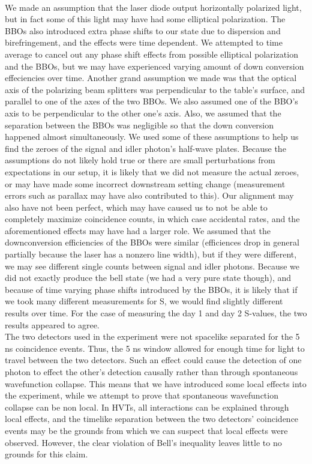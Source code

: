 \documentclass{article}
\begin{document}
    \\\indent We made an assumption that the laser diode output horizontally polarized light, but in fact some of this light may have had some elliptical polarization. The BBOs also introduced extra phase shifts to our state due to dispersion and birefringement, and the effects were time dependent. We attempted to time average to cancel out any phase shift effects from possible elliptical polarization and the BBOs, but we may have experienced varying amount of down conversion effeciencies over time. Another grand assumption we made was that the optical axis of the polarizing beam splitters was perpendicular to the table's surface, and parallel to one of the axes of the two BBOs. We also assumed one of the BBO's axis to be perpendicular to the other one's axis. Also, we assumed that the separation between the BBOs was negligible so that the down conversion happened almost simultaneously. We used some of these assumptions to help us find the zeroes of the signal and idler photon's half-wave plates. Because the assumptions do not likely hold true or there are small perturbations from expectations in our setup, it is likely that we did not measure the actual zeroes, or may have made some incorrect downstream setting change (measurement errors such as parallax may have also contributed to this). Our alignment may also have not been perfect, which may have caused us to not be able to completely maximize coincidence counts, in which case accidental rates, and the aforementioned effects may have had a larger role. We assumed that the downconversion efficiencies of the BBOs were similar (efficiences drop in general partially because the laser has a nonzero line width), but if they were different, we may see different single counts between signal and idler photons. Because we did not exactly produce the bell state (we had a very pure state though), and because of time varying phase shifts introduced by the BBOs, it is likely that if we took many different measurements for S, we would find slightly different results over time. For the case of measuring the day 1 and day 2 S-values, the two results appeared to agree.
    \\\indent The two detectors used in the experiment were not spacelike separated for the 5 ns coincidence events. Thus, the 5 ns window allowed for enough time for light to travel between the two detectors. Such an effect could cause the detection of one photon to effect the other's detection causally rather than through spontaneous wavefunction collapse. This means that we have introduced some local effects into the experiment, while we attempt to prove that spontaneous wavefunction collapse can be non local. In HVTs, all interactions can be explained through local effects, and the timelike separation between the two detectors' coincidence events may be the grounds from which we can suspect that local effects were observed. However, the clear violation of Bell's inequality leaves little to no grounds for this claim.
    
\end{document}
